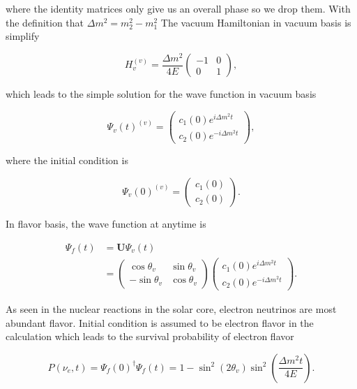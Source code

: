 where the identity matrices only give us an overall phase so we drop them. With the definition that $\Delta m^2 = m_2^2 - m_1^2$ The vacuum Hamiltonian in vacuum basis is simplify

\begin{equation}
H_v^{(v)} =  \frac{\Delta m^2}{4E} \begin{pmatrix}
-1 & 0 \\
0 & 1
\end{pmatrix},
\end{equation}

which leads to the simple solution for the wave function in vacuum basis

\begin{equation}
\Psi_v(t)^{(v)} = \begin{pmatrix}
c_1(0) e^{i\Delta m^2 t } \\
c_2(0) e^{ -i\Delta m^2 t } 
\end{pmatrix},
\end{equation}

where the initial condition is

\begin{equation}
\Psi_v(0)^{(v)} = \begin{pmatrix}
c_1(0) \\
c_2(0) 
\end{pmatrix}.
\end{equation}

In flavor basis, the wave function at anytime is

\begin{align}
\Psi_f(t) &= \mathbf{U}\Psi_v(t) \\
& = \begin{pmatrix} \cos\theta_v & \sin \theta_v \\ -\sin \theta_v & \cos \theta_v \end{pmatrix} \begin{pmatrix} c_1(0) e^{i\Delta m^2 t } \\
c_2(0) e^{ -i\Delta m^2 t }    \end{pmatrix} .
\end{align}

As seen in the nuclear reactions in the solar core, electron neutrinos are most abundant flavor. Initial condition is assumed to be electron flavor in the calculation which leads to the survival probability of electron flavor

\begin{equation}
P(\nu_e,t) = \Psi_f(0)^\dagger \Psi_f(t) = 1-\sin^2(2\theta_v)\sin^2\left( \frac{\Delta m^2 t}{4E} \right).
\end{equation}

